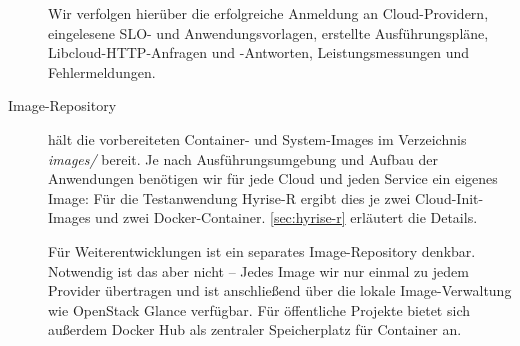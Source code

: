 \begin{description}
	Wir verfolgen hierüber die erfolgreiche Anmeldung an Cloud-Providern, eingelesene SLO- und Anwendungsvorlagen, erstellte Ausführungspläne, Libcloud-HTTP-Anfragen und -Antworten, Leistungsmessungen und Fehlermeldungen.	
	
	\item[Image-Repository] hält die vorbereiteten Container- und System-Images im Verzeichnis \emph{images/} bereit. Je nach Ausführungsumgebung und Aufbau der Anwendungen benötigen wir für jede Cloud und jeden Service ein eigenes Image: Für die Testanwendung Hyrise-R ergibt dies je zwei Cloud-Init-Images und zwei Docker-Container. \autoref{sec:hyrise-r} erläutert die Details.
	
	Für Weiterentwicklungen ist ein separates Image-Repository denkbar. Notwendig ist das aber nicht -- Jedes Image wir nur einmal zu jedem Provider übertragen und ist anschließend über die lokale Image-Verwaltung wie OpenStack Glance verfügbar. Für öffentliche Projekte bietet sich außerdem Docker Hub als zentraler Speicherplatz für Container an.
	
\end{description}